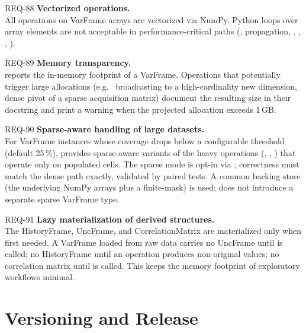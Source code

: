\begin{reqbox}{REQ-88}{\stable}
\textbf{Vectorized operations.}\\
All operations on VarFrame arrays are vectorized via NumPy. Python loops
over array elements are not acceptable in performance-critical paths
(, propagation, , ,
, ).
\end{reqbox}

\begin{reqbox}{REQ-89}{\stable}
\textbf{Memory transparency.}\\
 reports the in-memory footprint of a VarFrame.
Operations that potentially trigger large allocations (e.g.\ 
broadcasting to a high-cardinality new dimension, dense pivot of a sparse
acquisition matrix) document the resulting size in their docstring and
print a warning when the projected allocation exceeds 1\,GB.
\end{reqbox}

\begin{reqbox}{REQ-90}{\stable}
\textbf{Sparse-aware handling of large datasets.}\\
For VarFrame instances whose coverage drops below a configurable
threshold (default 25\,\%), \itc{} provides sparse-aware variants of the
heavy operations (, , )
that operate only on populated cells. The sparse mode is opt-in via
; correctness must match the dense path
exactly, validated by paired tests. A common backing store (the underlying NumPy arrays plus a finite-mask) is used; \itc{} does not
introduce a separate sparse VarFrame type.
\end{reqbox}

\begin{reqbox}{REQ-91}{\stable}
\textbf{Lazy materialization of derived structures.}\\
The HistoryFrame, UncFrame, and CorrelationMatrix are materialized only
when first needed. A VarFrame loaded from raw data carries no UncFrame
until  is called; no HistoryFrame until an
operation produces non-original values; no correlation matrix until
 is called. This keeps the memory footprint of
exploratory workflows minimal.
\end{reqbox}

\section{Versioning and Release}

